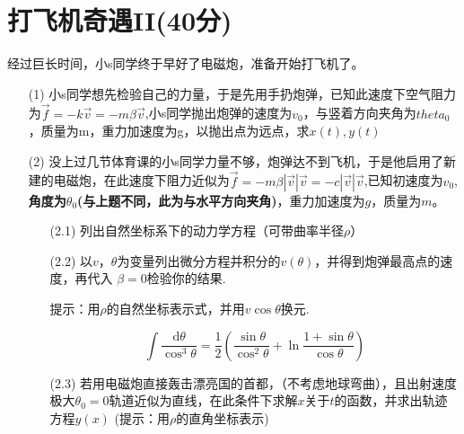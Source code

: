 \documentclass{article}
\begin{document}
\section*{打飞机奇遇II(40分)}
经过巨长时间，小s同学终于早好了电磁炮，准备开始打飞机了。
\begin{itemize}
\item[(1)]小s同学想先检验自己的力量，于是先用手扔炮弹，已知此速度下空气阻力为$\vec{f}=-k\vec{v}=-m\beta\vec{v}$,小s同学抛出炮弹的速度为$v_0$，与竖着方向夹角为$theta_0$，质量为m，重力加速度为g，以抛出点为远点，求$x(t),y(t)$
\item[(2)]没上过几节体育课的小s同学力量不够，炮弹达不到飞机，于是他启用了新建的电磁炮，在此速度下阻力近似为$\vec{f}=-m\beta|\vec{v}|\vec{v}=-c|\vec{v}|\vec{v}$,已知初速度为$v_0$,\textbf{角度为$\theta_0$(与上题不同，此为与水平方向夹角)}，重力加速度为$g$，质量为$m$。
\begin{itemize}
\item[(2.1)]列出自然坐标系下的动力学方程（可带曲率半径$\rho$）
\item[(2.2)]以$v，\theta$为变量列出微分方程并积分的$v(\theta)$，并得到炮弹最高点的速度，再代入 $\beta =0$检验你的结果.\par
提示：用$\rho$的自然坐标表示式，并用$v\cos\theta$换元.\par
    \[
    \int \dfrac{\mathrm{d}\theta}{\cos^3\theta}=\dfrac{1}{2}\left(\dfrac{\sin\theta}{\cos^2\theta}+\ln\dfrac{1+\sin\theta}{\cos\theta}\right)
    \]
\item[(2.3)]若用电磁炮直接轰击漂亮国的首都，（不考虑地球弯曲），且出射速度极大$\theta_0=0$轨道近似为直线，在此条件下求解$x$关于$t$的函数，并求出轨迹方程$y(x)$ (提示：用$\rho$的直角坐标表示)
\end{itemize}
\end{itemize}
\end{document}
